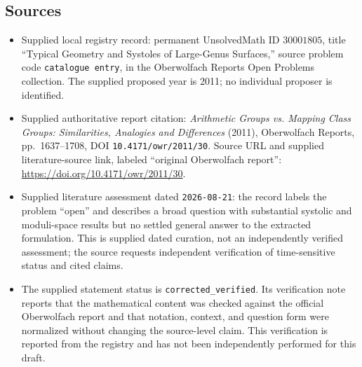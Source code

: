 \documentclass[11pt]{article}
\begin{document}
\subsection{Sources}
\begin{itemize}
\item Supplied local registry record: permanent UnsolvedMath ID \(30001805\), title ``Typical Geometry and Systoles of Large-Genus Surfaces,'' source problem code \texttt{catalogue entry}, in the Oberwolfach Reports Open Problems collection. The supplied proposed year is 2011; no individual proposer is identified.
\item Supplied authoritative report citation: \emph{Arithmetic Groups vs. Mapping Class Groups: Similarities, Analogies and Differences} (2011), Oberwolfach Reports, pp.\ 1637--1708, DOI \texttt{10.4171/owr/2011/30}. Source URL and supplied literature-source link, labeled ``original Oberwolfach report'': \url{https://doi.org/10.4171/owr/2011/30}.
\item Supplied literature assessment dated \texttt{2026-08-21}: the record labels the problem ``open'' and describes a broad question with substantial systolic and moduli-space results but no settled general answer to the extracted formulation. This is supplied dated curation, not an independently verified assessment; the source requests independent verification of time-sensitive status and cited claims.
\item The supplied statement status is \texttt{corrected\_verified}. Its verification note reports that the mathematical content was checked against the official Oberwolfach report and that notation, context, and question form were normalized without changing the source-level claim. This verification is reported from the registry and has not been independently performed for this draft.
\end{itemize}
\end{document}
